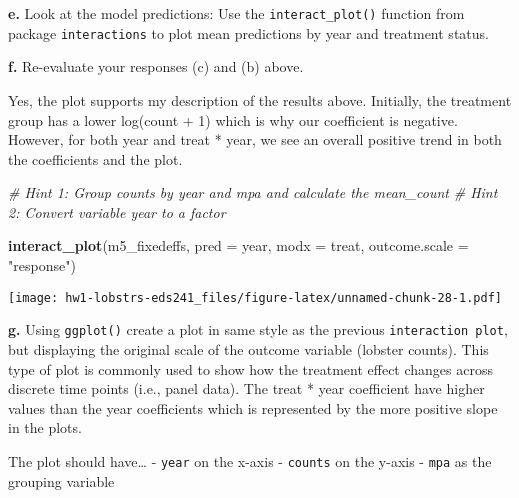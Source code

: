 \documentclass[
]{article}
\newenvironment{Shaded}{\begin{snugshade}}{\end{snugshade}}
\newcommand{\AttributeTok}[1]{\textcolor[rgb]{0.13,0.29,0.53}{#1}}
\newcommand{\CommentTok}[1]{\textcolor[rgb]{0.56,0.35,0.01}{\textit{#1}}}
\newcommand{\FunctionTok}[1]{\textcolor[rgb]{0.13,0.29,0.53}{\textbf{#1}}}
\newcommand{\NormalTok}[1]{#1}
\newcommand{\StringTok}[1]{\textcolor[rgb]{0.31,0.60,0.02}{#1}}
\begin{document}
\textbf{e.} Look at the model predictions: Use the
\texttt{interact\_plot()} function from package \texttt{interactions} to
plot mean predictions by year and treatment status.

\textbf{f.} Re-evaluate your responses (c) and (b) above.

Yes, the plot supports my description of the results above. Initially,
the treatment group has a lower log(count + 1) which is why our
coefficient is negative. However, for both year and treat * year, we see
an overall positive trend in both the coefficients and the plot.

\begin{Shaded}
\begin{Highlighting}[]
\CommentTok{\# Hint 1: Group counts by \textasciigrave{}year\textasciigrave{} and \textasciigrave{}mpa\textasciigrave{} and calculate the \textasciigrave{}mean\_count\textasciigrave{}}
\CommentTok{\# Hint 2: Convert variable \textasciigrave{}year\textasciigrave{} to a factor}

\FunctionTok{interact\_plot}\NormalTok{(m5\_fixedeffs, }\AttributeTok{pred =}\NormalTok{ year, }\AttributeTok{modx =}\NormalTok{ treat,}
              \AttributeTok{outcome.scale =} \StringTok{"response"}\NormalTok{)}
\end{Highlighting}
\end{Shaded}

\texttt{[image: hw1-lobstrs-eds241\_files/figure-latex/unnamed-chunk-28-1.pdf]}

\textbf{g.} Using \texttt{ggplot()} create a plot in same style as the
previous \texttt{interaction\ plot}, but displaying the original scale
of the outcome variable (lobster counts). This type of plot is commonly
used to show how the treatment effect changes across discrete time
points (i.e., panel data). The treat * year coefficient have higher
values than the year coefficients which is represented by the more
positive slope in the plots.

The plot should have\ldots{} - \texttt{year} on the x-axis -
\texttt{counts} on the y-axis - \texttt{mpa} as the grouping variable
\end{document}
